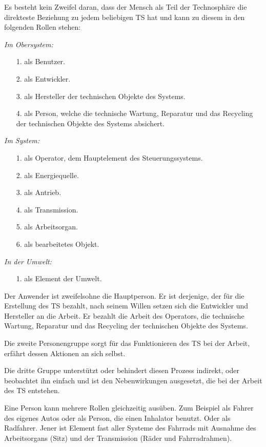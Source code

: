 \documentclass[11pt,a4paper]{article}
\begin{document}
Es besteht kein Zweifel daran, dass der Mensch als Teil der Technosphäre die
direkteste Beziehung zu jedem beliebigen TS hat und kann zu diesem in den
folgenden Rollen stehen:

\emph{Im Obersystem:} 
\begin{itemize}[noitemsep]
\item[1.] als Benutzer. 
\item[2.] als Entwickler. 
\item[3.] als Hersteller der technischen Objekte des Systems. 
\item[4.] als Person, welche die technische Wartung, Reparatur und das
  Recycling der technischen Objekte des Systems absichert.
\end{itemize}
\emph{Im System:} 
\begin{itemize}[noitemsep]
\item[1.] als Operator, dem Hauptelement des Steuerungssystems. 
\item[2.] als Energiequelle. 
\item[3.] als Antrieb. 
\item[4.] als Transmission. 
\item[5.] als Arbeitsorgan. 
\item[6.] als bearbeitetes Objekt. 
\end{itemize}
\emph{In der Umwelt:} 
\begin{itemize}[noitemsep]
\item[1.] als Element der Umwelt. 
\end{itemize}
Der Anwender ist zweifelsohne die Hauptperson. Er ist derjenige, der für die
Erstellung des TS bezahlt, nach seinem Willen setzen sich die Entwickler und
Hersteller an die Arbeit. Er bezahlt die Arbeit des Operators, die technische
Wartung, Reparatur und das Recycling der technischen Objekte des Systems.

Die zweite Personengruppe sorgt für das Funktionieren des TS bei der Arbeit,
erfährt dessen Aktionen an sich selbst.

Die dritte Gruppe unterstützt oder behindert diesen Prozess indirekt, oder
beobachtet ihn einfach und ist den Nebenwirkungen ausgesetzt, die bei der
Arbeit des TS entstehen.

Eine Person kann mehrere Rollen gleichzeitig ausüben. Zum Beispiel als Fahrer
des eigenes Autos oder als Person, die einen Inhalator benutzt. Oder als
Radfahrer.  Jener ist Element fast aller Systeme des Fahrrads mit Ausnahme des
Arbeitsorgans (Sitz) und der Transmission (Räder und Fahrradrahmen).
\end{document}
